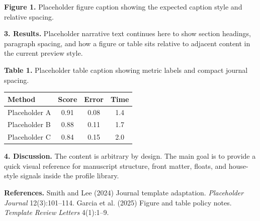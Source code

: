 \documentclass[10pt,a4paper]{article}
\begin{document}
\begin{center}\end{center}\noindent\textbf{Figure 1.} Placeholder figure caption showing the expected caption style and relative spacing.\par\vspace{0.5em}

\textbf{3. Results.} Placeholder narrative text continues here to show section headings, paragraph spacing, and how a figure or table sits relative to adjacent content in the current preview style.

\noindent\textbf{Table 1.} Placeholder table caption showing metric labels and compact journal spacing.\par\begin{center}
\begin{tabular}{lccc}
\toprule
Method & Score & Error & Time\\
\midrule
Placeholder A & 0.91 & 0.08 & 1.4\\
Placeholder B & 0.88 & 0.11 & 1.7\\
Placeholder C & 0.84 & 0.15 & 2.0\\
\bottomrule
\end{tabular}\end{center}\vspace{0.5em}

\textbf{4. Discussion.} The content is arbitrary by design. The main goal is to provide a quick visual reference for manuscript structure, front matter, floats, and house-style signals inside the profile library.



\vspace{0.5em}
\noindent \textbf{References.} Smith and Lee (2024) Journal template adaptation. \textit{Placeholder Journal} 12(3):101--114. Garcia et al. (2025) Figure and table policy notes. \textit{Template Review Letters} 4(1):1--9.\par
\vspace{0.6em}
\end{document}
